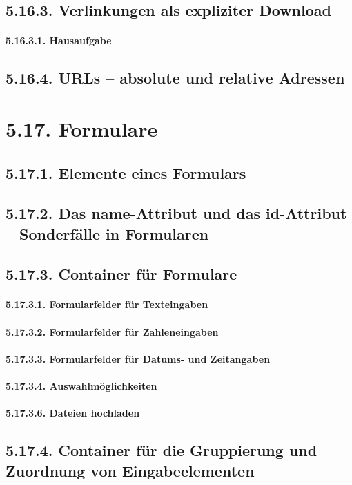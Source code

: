 \subsection{5.16.3.	Verlinkungen als expliziter Download}
\paragraph{5.16.3.1.	Hausaufgabe}
\subsection{5.16.4.	URLs – absolute und relative Adressen}
\section{5.17.	Formulare}
\subsection{5.17.1.	Elemente eines Formulars}
\subsection{5.17.2.	Das name-Attribut und das id-Attribut – Sonderfälle in Formularen}
\subsection{5.17.3.	Container für Formulare}
\paragraph{5.17.3.1.	Formularfelder für Texteingaben}
\paragraph{5.17.3.2.	Formularfelder für Zahleneingaben}
\paragraph{5.17.3.3.	Formularfelder für Datums- und Zeitangaben}
\paragraph{5.17.3.4.	Auswahlmöglichkeiten}
\paragraph{5.17.3.6.	Dateien hochladen}
\subsection{5.17.4.	Container für die Gruppierung und Zuordnung von Eingabeelementen}
